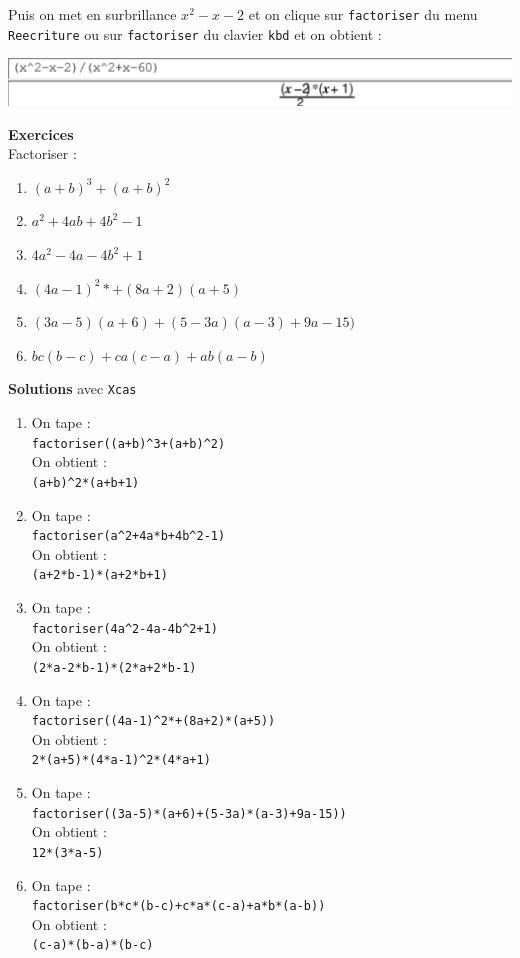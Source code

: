 \documentclass[a4paper,11pt]{book}
\begin{document}
Puis on met en surbrillance $x^2-x-2$ et on clique sur {\tt factoriser} du menu 
{\tt Reecriture} ou sur  {\tt factoriser} du clavier {\tt kbd} et on obtient :
\begin{center}\includegraphics[width=\textwidth]{factorise}\end{center}

{\bf Exercices}\\
Factoriser :
\begin{enumerate}
\item $(a+b)^3+(a+b)^2$
\item $a^2+4ab+4b^2-1$
\item $4a^2-4a-4b^2+1$
\item $(4a-1)^2*+(8a+2)(a+5)$
\item $(3a-5)(a+6)+(5-3a)(a-3)+9a-15)$
\item $bc(b-c)+ca(c-a)+ab(a-b)$
\end{enumerate}
{\bf Solutions} avec {\tt Xcas}
\begin{enumerate}
\item On tape :\\
{\tt factoriser((a+b)\verb|^|3+(a+b)\verb|^|2)}\\
On obtient :\\
{\tt (a+b)\verb|^|2*(a+b+1)}
\item On tape :\\
{\tt factoriser(a\verb|^|2+4a*b+4b\verb|^|2-1)}\\
On obtient :\\
{\tt (a+2*b-1)*(a+2*b+1)}
\item On tape :\\
{\tt factoriser(4a\verb|^|2-4a-4b\verb|^|2+1)}\\
On obtient :\\
{\tt (2*a-2*b-1)*(2*a+2*b-1)}
\item On tape :\\
{\tt factoriser((4a-1)\verb|^|2*+(8a+2)*(a+5))}\\
On obtient :\\
{\tt 2*(a+5)*(4*a-1)\verb|^|2*(4*a+1)}
\item On tape :\\
{\tt factoriser((3a-5)*(a+6)+(5-3a)*(a-3)+9a-15))}\\
On obtient :\\
{\tt 12*(3*a-5)}
\item On tape :\\
{\tt factoriser(b*c*(b-c)+c*a*(c-a)+a*b*(a-b))}\\
On obtient :\\
{\tt (c-a)*(b-a)*(b-c)}
\end{enumerate}
\end{document}
